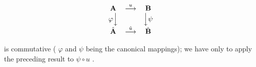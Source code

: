 \[
\begin{array}{c c c} \mathbf {A} & \stackrel {{u}} {{\longrightarrow}} & \mathbf {B} \\ \varphi \Big \downarrow & & \Big \downarrow \psi \\ \hat {\mathbf {A}} & \stackrel {{\hat {u}}} {{\longrightarrow}} & \hat {\mathbf {B}} \end{array}
\]

is commutative ( \(\varphi\) and \(\psi\) being the canonical mappings); we have only to apply the preceding result to \(\psi \circ u\) .

